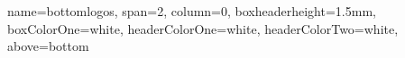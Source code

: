 \documentclass[a0paper,portrait]{baposter}
\newcommand{\footerfont}{\footnotesize}
\begin{document}
\begin{poster}


%


\headerbox{}
{name=bottomlogos, span=2, column=0, boxheaderheight=1.5mm, boxColorOne=white, headerColorOne=white, headerColorTwo=white, above=bottom}{
\newlength{\logoheight}
\setlength{\logoheight}{6mm}
\begin{center}
\setlength{\tabcolsep}{0mm}


\end{center}}
\end{poster}
\end{document}
